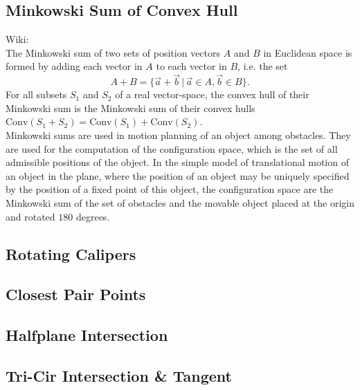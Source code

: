 \documentclass[10pt]{article}
\begin{document}
{\subsection{Minkowski Sum of Convex Hull}
\noindent
Wiki: \\
The Minkowski sum of two sets of position vectors $A$ and $B$ in Euclidean space is formed by adding each vector in $A$ to each vector in $B$, i.e. the set
\begin{displaymath}
A+B=\{ \vec{a} + \vec{b} \, | \, \vec{a} \in A, \vec{b} \in B \}.
\end{displaymath}
For all subsets $S_1$ and $S_2$ of a real vector-space, the convex hull of their Minkowski sum is the Minkowski sum of their convex hulls $\mathrm{Conv} (S_1 + S_2) = \mathrm{Conv} (S_1) + \mathrm{Conv} (S_2)$. \\
Minkowski sums are used in motion planning of an object among obstacles. They are used for the computation of the configuration space, which is the set of all admissible positions of the object. In the simple model of translational motion of an object in the plane, where the position of an object may be uniquely specified by the position of a fixed point of this object, the configuration space are the Minkowski sum of the set of obstacles and the movable object placed at the origin and rotated $180$ degrees. \\

\subsection{Rotating Calipers}

\subsection{Closest Pair Points}

\subsection{Halfplane Intersection}


\subsection{Tri-Cir Intersection \& Tangent}



}
\end{document}
